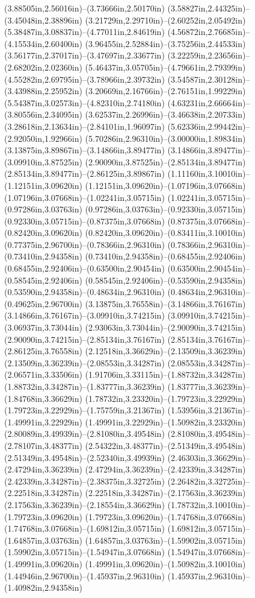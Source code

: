 (3.88505in,2.56016in)--(3.73666in,2.50170in) (3.58827in,2.44325in)--(3.45048in,2.38896in) (3.21729in,2.29710in)--(2.60252in,2.05492in) (5.38487in,3.08837in)--(4.77011in,2.84619in) (4.56872in,2.76685in)--(4.15534in,2.60400in) (3.96455in,2.52884in)--(3.75256in,2.44533in) (3.56177in,2.37017in)--(3.47697in,2.33677in) (3.22259in,2.23656in)--(2.68202in,2.02360in) (5.46437in,3.05705in)--(4.79661in,2.79399in) (4.55282in,2.69795in)--(3.78966in,2.39732in) (3.54587in,2.30128in)--(3.43988in,2.25952in) (3.20669in,2.16766in)--(2.76151in,1.99229in) (5.54387in,3.02573in)--(4.82310in,2.74180in) (4.63231in,2.66664in)--(3.80556in,2.34095in) (3.62537in,2.26996in)--(3.46638in,2.20733in) (3.28618in,2.13634in)--(2.84101in,1.96097in) (5.62336in,2.99442in)--(2.92050in,1.92966in) (5.70286in,2.96310in)--(3.00000in,1.89834in) (3.13875in,3.89867in)--(3.14866in,3.89477in) (3.14866in,3.89477in)--(3.09910in,3.87525in) (2.90090in,3.87525in)--(2.85134in,3.89477in) (2.85134in,3.89477in)--(2.86125in,3.89867in) (1.11160in,3.10010in)--(1.12151in,3.09620in) (1.12151in,3.09620in)--(1.07196in,3.07668in) (1.07196in,3.07668in)--(1.02241in,3.05715in) (1.02241in,3.05715in)--(0.97286in,3.03763in) (0.97286in,3.03763in)--(0.92330in,3.05715in) (0.92330in,3.05715in)--(0.87375in,3.07668in) (0.87375in,3.07668in)--(0.82420in,3.09620in) (0.82420in,3.09620in)--(0.83411in,3.10010in) (0.77375in,2.96700in)--(0.78366in,2.96310in) (0.78366in,2.96310in)--(0.73410in,2.94358in) (0.73410in,2.94358in)--(0.68455in,2.92406in) (0.68455in,2.92406in)--(0.63500in,2.90454in) (0.63500in,2.90454in)--(0.58545in,2.92406in) (0.58545in,2.92406in)--(0.53590in,2.94358in) (0.53590in,2.94358in)--(0.48634in,2.96310in) (0.48634in,2.96310in)--(0.49625in,2.96700in) (3.13875in,3.76558in)--(3.14866in,3.76167in) (3.14866in,3.76167in)--(3.09910in,3.74215in) (3.09910in,3.74215in)--(3.06937in,3.73044in) (2.93063in,3.73044in)--(2.90090in,3.74215in) (2.90090in,3.74215in)--(2.85134in,3.76167in) (2.85134in,3.76167in)--(2.86125in,3.76558in) (2.12518in,3.36629in)--(2.13509in,3.36239in) (2.13509in,3.36239in)--(2.08553in,3.34287in) (2.08553in,3.34287in)--(2.06571in,3.33506in) (1.91706in,3.33115in)--(1.88732in,3.34287in) (1.88732in,3.34287in)--(1.83777in,3.36239in) (1.83777in,3.36239in)--(1.84768in,3.36629in) (1.78732in,3.23320in)--(1.79723in,3.22929in) (1.79723in,3.22929in)--(1.75759in,3.21367in) (1.53956in,3.21367in)--(1.49991in,3.22929in) (1.49991in,3.22929in)--(1.50982in,3.23320in) (2.80089in,3.49939in)--(2.81080in,3.49548in) (2.81080in,3.49548in)--(2.78107in,3.48377in) (2.54322in,3.48377in)--(2.51349in,3.49548in) (2.51349in,3.49548in)--(2.52340in,3.49939in) (2.46303in,3.36629in)--(2.47294in,3.36239in) (2.47294in,3.36239in)--(2.42339in,3.34287in) (2.42339in,3.34287in)--(2.38375in,3.32725in) (2.26482in,3.32725in)--(2.22518in,3.34287in) (2.22518in,3.34287in)--(2.17563in,3.36239in) (2.17563in,3.36239in)--(2.18554in,3.36629in) (1.78732in,3.10010in)--(1.79723in,3.09620in) (1.79723in,3.09620in)--(1.74768in,3.07668in) (1.74768in,3.07668in)--(1.69812in,3.05715in) (1.69812in,3.05715in)--(1.64857in,3.03763in) (1.64857in,3.03763in)--(1.59902in,3.05715in) (1.59902in,3.05715in)--(1.54947in,3.07668in) (1.54947in,3.07668in)--(1.49991in,3.09620in) (1.49991in,3.09620in)--(1.50982in,3.10010in) (1.44946in,2.96700in)--(1.45937in,2.96310in) (1.45937in,2.96310in)--(1.40982in,2.94358in) 